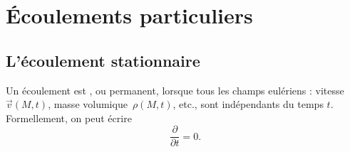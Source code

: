 \documentclass[12pt,fancy]{cours}
\begin{document}

\section{Écoulements particuliers}
\subsection{L'écoulement stationnaire}

\begin{definition}\label{def:stat}
Un écoulement est , ou permanent, lorsque tous les champs eulériens : vitesse $\Vec{v}(M,t)$, masse volumique~$\rho(M,t)$,  etc., sont indépendants du temps $t$. Formellement, on peut écrire
$$\frac{\partial }{\partial t} = 0.$$
\end{definition}
\end{document}
